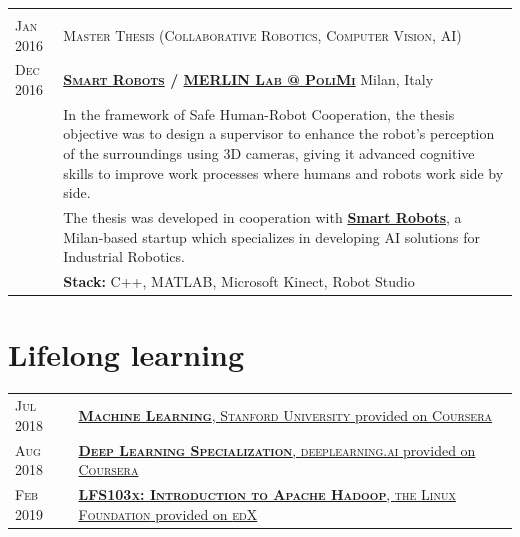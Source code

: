 \documentclass[a4paper,10pt]{article}
\begin{document}
\begin{tabular}{p{1.7cm}|p{15.5cm}}
      \multicolumn{2}{c}{} \\
      \centering\textsc{Jan 2016 } & 
      \textsc{Master Thesis (Collaborative Robotics, Computer Vision, AI)} \\
      \centering\textsc{Dec 2016} &
      \textsc{\textbf{\href{http://smartrobots.it/}{Smart Robots} / \href{http://merlin.dei.polimi.it/}{MERLIN Lab @ PoliMi}}} \hfill Milan, Italy\\
      & In the framework of Safe Human-Robot Cooperation, the thesis objective was to design a supervisor to enhance the robot's perception of the surroundings using 3D cameras, giving it advanced cognitive skills to improve work processes where humans and robots work side by side.\\
      & The thesis was developed in cooperation with \textbf{\href{http://smartrobots.it/}{Smart Robots}}, a Milan-based startup which specializes in developing AI solutions for Industrial Robotics.\\
      & \textbf{Stack:} C++, MATLAB, Microsoft Kinect, Robot Studio\\
   \end{tabular}

   \section{Lifelong learning}
   \begin{tabular}{p{1.7cm}|p{15.5cm}}
      \centering\textsc{Jul 2018} &
      \href{https://www.coursera.org/account/accomplishments/certificate/PHU5XX9EQ5LP}{\textbf{\textsc{Machine Learning}}, \textsc{Stanford University} provided on \textsc{Coursera}} \\
      
      \centering\textsc{Aug 2018} &
      \href{https://www.coursera.org/account/accomplishments/specialization/certificate/MQRAWL6XD2QW}{\textbf{\textsc{Deep Learning Specialization}}, \textsc{deeplearning.ai} provided on \textsc{Coursera}} \\
      
      \centering\textsc{Feb 2019} &
      \href{https://courses.edx.org/certificates/62fb5163c20048faa605408b3f931718}{\textbf{\textsc{LFS103x: Introduction to Apache Hadoop}}, \textsc{the Linux Foundation} provided on \textsc{edX}} \\

   \end{tabular}
\end{document}
